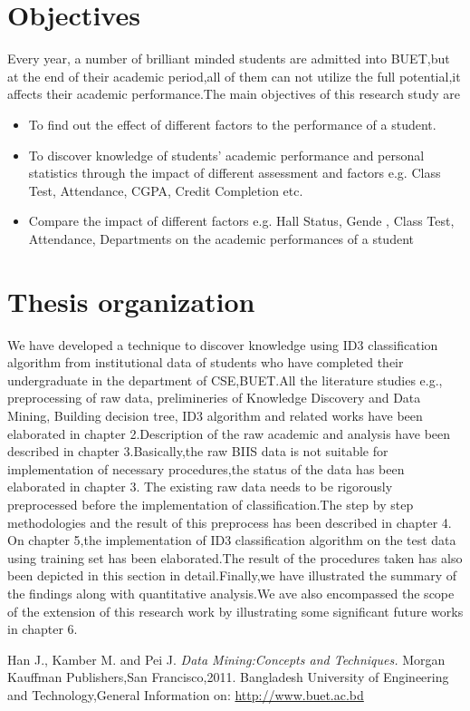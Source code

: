 \documentclass[a4paper,12pt]{book}
\begin{document}
\section{Objectives}
Every year, a number of brilliant minded students are admitted into BUET,but at the end of their academic period,all of them can not utilize the full potential,it affects their academic performance.The main objectives of this research study are
\begin{itemize}
\item To find out the effect of different factors to the performance of a student.
\item To discover knowledge of students’ academic performance and personal 
statistics through the impact of different assessment and factors e.g. Class 
Test, Attendance, CGPA, Credit Completion etc.
\item Compare the impact of different factors e.g. Hall Status, Gende , Class 
Test, Attendance, Departments on the academic performances of a 
student
\end{itemize}
 
\section{Thesis organization}
We have developed a technique to discover knowledge using ID3 classification algorithm from institutional data of students who have completed their undergraduate in the department of CSE,BUET.All the literature studies e.g., preprocessing of raw data, prelimineries of Knowledge Discovery and Data Mining, Building decision tree, ID3 algorithm and related works have been elaborated in chapter 2.Description of the raw academic and analysis have been described in chapter 3.Basically,the raw BIIS data is not suitable for implementation of necessary procedures,the status of the data has been elaborated in chapter 3.
The existing raw data needs to be rigorously preprocessed before the implementation of classification.The step by step methodologies and the result of this preprocess has been described in chapter 4.
On chapter 5,the implementation of ID3 classification algorithm on the test data using training set has been elaborated.The result of the procedures taken has also been depicted in this section in detail.Finally,we have illustrated the summary of the findings along with quantitative analysis.We ave also encompassed the scope of the extension of this research work by illustrating some significant future works in chapter 6.  

\begin{thebibliography}{9}
Han J., Kamber M. and Pei J. \textit{Data Mining:Concepts and Techniques.} Morgan Kauffman Publishers,San Francisco,2011.
Bangladesh University of Engineering and Technology,General Information on:
\url{http://www.buet.ac.bd} 
\end{thebibliography}
\end{document}
